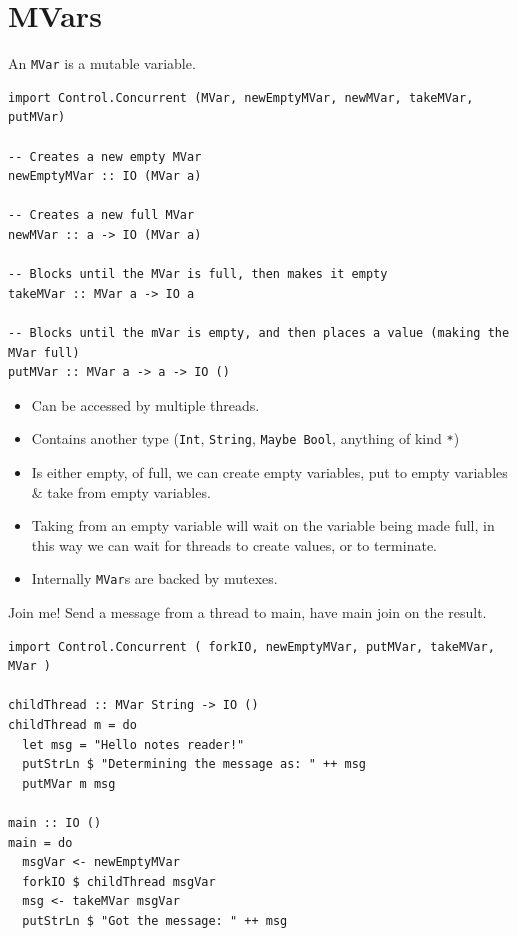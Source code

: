 \section{MVars}
An \texttt{MVar} is a mutable variable.
\begin{verbatim}
import Control.Concurrent (MVar, newEmptyMVar, newMVar, takeMVar, putMVar)

-- Creates a new empty MVar
newEmptyMVar :: IO (MVar a)

-- Creates a new full MVar
newMVar :: a -> IO (MVar a)

-- Blocks until the MVar is full, then makes it empty
takeMVar :: MVar a -> IO a

-- Blocks until the mVar is empty, and then places a value (making the MVar full)
putMVar :: MVar a -> a -> IO ()
\end{verbatim}
\begin{itemize}
    \item Can be accessed by multiple threads.
    \item Contains another type (\texttt{Int}, \texttt{String}, \texttt{Maybe Bool}, anything of kind \texttt{*})
    \item Is either empty, of full, we can create empty variables, put to empty variables \& take from empty variables.
    \item Taking from an empty variable will wait on the variable being made full, in this way we can wait for threads to create values, or to terminate.
    \item Internally \texttt{MVar}s are backed by mutexes.
\end{itemize}

\begin{examplebox}{Join me!}
    Send a message from a thread to main, have main join on the result.
    \tcblower
    \begin{verbatim}
import Control.Concurrent ( forkIO, newEmptyMVar, putMVar, takeMVar, MVar )

childThread :: MVar String -> IO ()
childThread m = do
  let msg = "Hello notes reader!"
  putStrLn $ "Determining the message as: " ++ msg
  putMVar m msg

main :: IO ()
main = do
  msgVar <- newEmptyMVar
  forkIO $ childThread msgVar
  msg <- takeMVar msgVar
  putStrLn $ "Got the message: " ++ msg
    \end{verbatim}
\end{examplebox}


